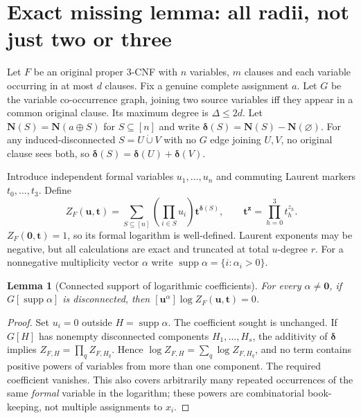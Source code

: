 \documentclass[11pt]{article}
\newtheorem{lemma}{Lemma}
\newcommand{\vv}[1]{\boldsymbol{#1}}
\begin{document}
\section{Exact missing lemma: all radii, not just two or three}
Let $F$ be an original proper 3-CNF with $n$ variables, $m$ clauses and each variable occurring in at most $d$ clauses. Fix a genuine complete assignment $a$. Let $G$ be the variable co-occurrence graph, joining two source variables iff they appear in a common original clause. Its maximum degree is $\Delta\le2d$. Let $\vv N(S)=\vv N(a\oplus S)$ for $S\subseteq[n]$ and write $\boldsymbol\delta(S)=\vv N(S)-\vv N(\varnothing)$. For any induced-disconnected $S=U\dot\cup V$ with no $G$ edge joining $U,V$, no original clause sees both, so $\boldsymbol\delta(S)=\boldsymbol\delta(U)+\boldsymbol\delta(V)$.

Introduce independent formal variables $u_1,\ldots,u_n$ and commuting Laurent markers $t_0,\ldots,t_3$. Define
\begin{equation}\label{eq:Z}
Z_F(\vv u,\vv t)=\sum_{S\subseteq[n]} \left(\prod_{i\in S}u_i\right)\vv t^{\boldsymbol\delta(S)},\qquad \vv t^{\vv z}=\prod_{h=0}^3t_h^{z_h}.
\end{equation}
$Z_F(\vv0,\vv t)=1$, so its formal logarithm is well-defined. Laurent exponents may be negative, but all calculations are exact and truncated at total $u$-degree $r$. For a nonnegative multiplicity vector $\alpha$ write $\operatorname{supp}\alpha=\{i:\alpha_i>0\}$.

\begin{lemma}[Connected support of logarithmic coefficients]\label{lem:conn}
For every $\alpha\ne\vv0$, if $G[\operatorname{supp}\alpha]$ is disconnected, then $[\vv u^\alpha]\log Z_F(\vv u,\vv t)=0$.
\end{lemma}
\begin{proof}
Set $u_i=0$ outside $H=\operatorname{supp}\alpha$. The coefficient sought is unchanged. If $G[H]$ has nonempty disconnected components $H_1,\ldots,H_s$, the additivity of $\boldsymbol\delta$ implies $Z_{F,H}=\prod_qZ_{F,H_q}$. Hence $\log Z_{F,H}=\sum_q\log Z_{F,H_q}$, and no term contains positive powers of variables from more than one component. The required coefficient vanishes. This also covers arbitrarily many repeated occurrences of the same \emph{formal} variable in the logarithm; these powers are combinatorial book-keeping, not multiple assignments to $x_i$.
\end{proof}
\end{document}
